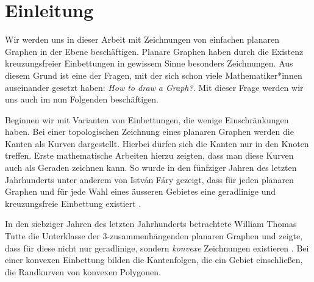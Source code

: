 \chapter{Einleitung}
Wir werden uns in dieser Arbeit mit Zeichnungen von einfachen planaren Graphen in der Ebene beschäftigen. Planare Graphen haben durch die Existenz kreuzungsfreier Einbettungen in gewissem Sinne besonders \grqq{ } Zeichnungen. Aus diesem Grund ist eine der Fragen, mit der sich schon viele Mathematiker*innen auseinander gesetzt haben: \glqq\textit{How to draw a Graph?}\grqq\cite{tutte63}. Mit dieser Frage werden wir uns auch im nun Folgenden beschäftigen. 

Beginnen wir mit Varianten von Einbettungen, die wenige Einschränkungen haben. Bei einer topologischen Zeichnung eines planaren Graphen werden die Kanten als Kurven dargestellt. Hierbei dürfen sich die Kanten nur in den Knoten treffen. Erste mathematische Arbeiten hierzu zeigten, dass man diese Kurven auch als Geraden zeichnen kann. So wurde in den fünfziger Jahren des letzten Jahrhunderts unter anderem von István Fáry gezeigt, dass für jeden planaren Graphen und für jede Wahl eines äusseren Gebietes eine geradlinige und kreuzungsfreie Einbettung existiert \cite{fary48}.

In den siebziger Jahren des letzten Jahrhunderts betrachtete William Thomas Tutte die Unterklasse der 3-zusam\-men\-hängenden planaren Graphen und zeigte, dass für diese nicht nur geradlinige, sondern \textit{konvexe} Zeichnungen existieren \cite{tutte63}. Bei einer konvexen Einbettung bilden die Kantenfolgen, die ein Gebiet einschließen, die Randkurven von konvexen Polygonen.

